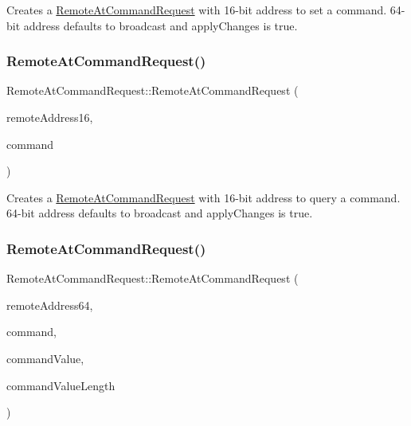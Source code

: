 Creates a \hyperlink{class_remote_at_command_request}{Remote\+At\+Command\+Request} with 16-\/bit address to set a command. 64-\/bit address defaults to broadcast and apply\+Changes is true. \hypertarget{class_remote_at_command_request_ae8139e39010dcd8956a4281109885a81}{}\label{class_remote_at_command_request_ae8139e39010dcd8956a4281109885a81} 
\subsubsection{\texorpdfstring{Remote\+At\+Command\+Request()}{RemoteAtCommandRequest()}\hspace{0.1cm}{\footnotesize\ttfamily [2/4]}}
{\footnotesize\ttfamily Remote\+At\+Command\+Request\+::\+Remote\+At\+Command\+Request (\begin{DoxyParamCaption}\item[{uint16\+\_\+t}]{remote\+Address16,  }\item[{uint8\+\_\+t $\ast$}]{command }\end{DoxyParamCaption})}

Creates a \hyperlink{class_remote_at_command_request}{Remote\+At\+Command\+Request} with 16-\/bit address to query a command. 64-\/bit address defaults to broadcast and apply\+Changes is true. \hypertarget{class_remote_at_command_request_ae49de42cdec0b9689882e2372a3bae1d}{}\label{class_remote_at_command_request_ae49de42cdec0b9689882e2372a3bae1d} 
\subsubsection{\texorpdfstring{Remote\+At\+Command\+Request()}{RemoteAtCommandRequest()}\hspace{0.1cm}{\footnotesize\ttfamily [3/4]}}
{\footnotesize\ttfamily Remote\+At\+Command\+Request\+::\+Remote\+At\+Command\+Request (\begin{DoxyParamCaption}\item[{\hyperlink{class_x_bee_address64}{X\+Bee\+Address64} \&}]{remote\+Address64,  }\item[{uint8\+\_\+t $\ast$}]{command,  }\item[{uint8\+\_\+t $\ast$}]{command\+Value,  }\item[{uint8\+\_\+t}]{command\+Value\+Length }\end{DoxyParamCaption})}

